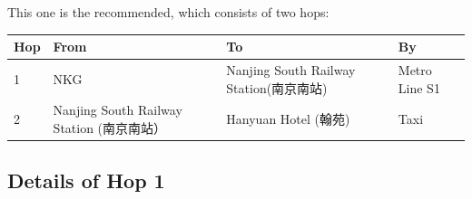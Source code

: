 \documentclass[11pt]{article}
\begin{document}
This one is the recommended, which consists of two hops:

 \begin{center}
 \begin{tabular}{| l | p{4.5cm} | p{4.5cm} | p{2.5cm}|}
  	\hline
	\textbf{Hop} 	&	\bf{From}		& \bf{To	}														 & \bf{By} \\
	\hline
	1					&	NKG				& Nanjing South Railway Station(南京南站)	& Metro Line S1\\
	\hline
	2					&	Nanjing South Railway Station (南京南站）%
												& Hanyuan Hotel (翰苑)			    & Taxi	\\
	\hline
\end{tabular}
\end{center}

\subsection{Details of Hop 1}
\end{document}
